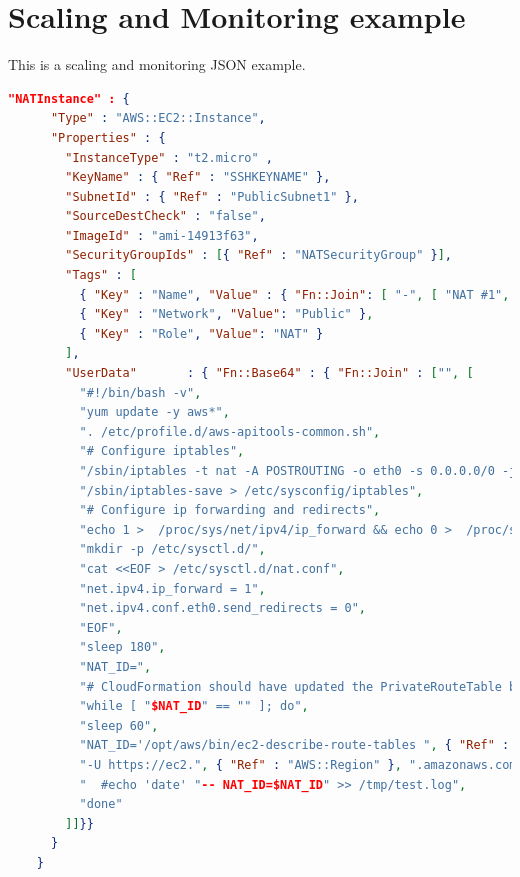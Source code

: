 \documentclass{acm_proc_article-sp}
\begin{document}
\section{Scaling and Monitoring example}
\label{app:nat}
This is a scaling and monitoring JSON example.
\begin{lstlisting}[language=json,firstnumber=1]
"NATInstance" : {
      "Type" : "AWS::EC2::Instance",
      "Properties" : {
        "InstanceType" : "t2.micro" ,
        "KeyName" : { "Ref" : "SSHKEYNAME" },
        "SubnetId" : { "Ref" : "PublicSubnet1" },
        "SourceDestCheck" : "false",
        "ImageId" : "ami-14913f63",
        "SecurityGroupIds" : [{ "Ref" : "NATSecurityGroup" }],
        "Tags" : [
          { "Key" : "Name", "Value" : { "Fn::Join": [ "-", [ "NAT #1", { "Ref": "AWS::StackName" } ] ] } },
          { "Key" : "Network", "Value": "Public" },
          { "Key" : "Role", "Value": "NAT" }
        ],
        "UserData"       : { "Fn::Base64" : { "Fn::Join" : ["", [
          "#!/bin/bash -v",
          "yum update -y aws*",
          ". /etc/profile.d/aws-apitools-common.sh",
          "# Configure iptables",
          "/sbin/iptables -t nat -A POSTROUTING -o eth0 -s 0.0.0.0/0 -j MASQUERADE",
          "/sbin/iptables-save > /etc/sysconfig/iptables",
          "# Configure ip forwarding and redirects",
          "echo 1 >  /proc/sys/net/ipv4/ip_forward && echo 0 >  /proc/sys/net/ipv4/conf/eth0/send_redirects",
          "mkdir -p /etc/sysctl.d/",
          "cat <<EOF > /etc/sysctl.d/nat.conf",
          "net.ipv4.ip_forward = 1",
          "net.ipv4.conf.eth0.send_redirects = 0",
          "EOF",
          "sleep 180",
          "NAT_ID=",
          "# CloudFormation should have updated the PrivateRouteTable by now (due to yum update), however loop to make sure",
          "while [ "$NAT_ID" == "" ]; do",
          "sleep 60",
          "NAT_ID='/opt/aws/bin/ec2-describe-route-tables ", { "Ref" : "PrivateRouteTable" },
          "-U https://ec2.", { "Ref" : "AWS::Region" }, ".amazonaws.com | grep 0.0.0.0/0 | awk '{print $2;}'",
          "  #echo 'date' "-- NAT_ID=$NAT_ID" >> /tmp/test.log",
          "done"
        ]]}}
      }
    }
\end{lstlisting}
\end{document}
